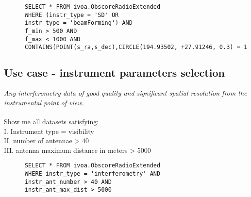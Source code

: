 \begin{verbatim}
      SELECT * FROM ivoa.ObscoreRadioExtended
      WHERE (instr_type = 'SD' OR
      instr_type = 'beamForming') AND
      f_min > 500 AND
      f_max < 1000 AND
      CONTAINS(POINT(s_ra,s_dec),CIRCLE(194.93502, +27.91246, 0.3) = 1     
\end{verbatim}




\subsection{Use case - instrument parameters selection }
\textit{Any interferometry data of good quality and significant spatial resolution from the instrumental point of view. }\\ \\
Show me all datasets satisfying:\\
I. Instrument type = visibility \\
II. number of antennae > 40 \\
III. antenna maximum distance in meters  > 5000 \\

\begin{verbatim}
      SELECT * FROM ivoa.ObscoreRadioExtended
      WHERE instr_type = 'interferometry' AND
      instr_ant_number > 40 AND
      instr_ant_max_dist > 5000 
\end{verbatim}



